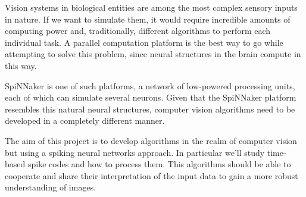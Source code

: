 Vision systems in biological entities are among the most complex sensory
inputs in nature. If we want to simulate them, it would require incredible
amounts of computing power and, traditionally, different algorithms to perform
each individual task. A parallel computation platform is the best way to go
while attempting to solve this problem, since neural structures in the brain 
compute in this way. 

SpiNNaker is one of such platforms, a network of low-powered processing units,
each of which can simulate several neurons. Given that the SpiNNaker platform
resembles this natural neural structures, computer vision algorithms need to be
developed in a completely different manner.

The aim of this project is to develop algorithms in the realm of computer vision
but using a spiking neural networks approach. In particular we'll study 
time-based spike codes and how to process them. This algorithms should be 
able to cooperate and share their interpretation of the input data to gain a
more robust understanding of images.

